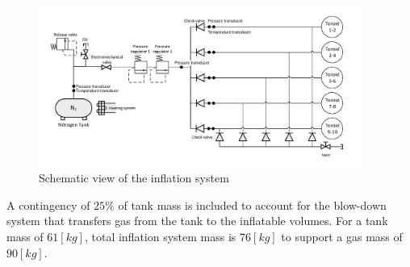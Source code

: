 \begin{figure}[h]
		\centering
		\includegraphics[width=0.95\textwidth]{./Figure/Structure/infsys.pdf}
		\caption[Schematic view of the inflation system]{Schematic view of the inflation system}%
		\label{fig:infsys}
\end{figure}


A contingency of $25\%$ of tank mass is included to account for the blow-down system that transfers gas from the tank to the inflatable volumes. For a tank mass of $61 \left[kg\right]$, total inflation system mass is $76 \left[kg\right]$ to support a gas mass of $90 \left[kg\right]$.